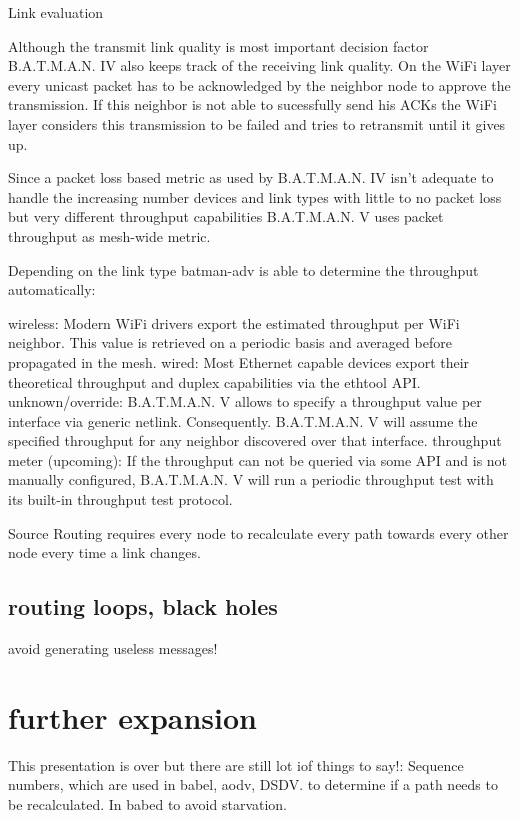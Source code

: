 \documentclass{article}
\begin{document}
\begin{frame}{Link evaluation}
 
Although the transmit link quality is most important decision factor B.A.T.M.A.N. IV also keeps track of the receiving link quality. On the WiFi layer every unicast packet has to be acknowledged by the neighbor node to approve the transmission. If this neighbor is not able to sucessfully send his ACKs the WiFi layer considers this transmission to be failed and tries to retransmit until it gives up.



Since a packet loss based metric as used by B.A.T.M.A.N. IV isn't adequate to handle the increasing number devices and link types with little to no packet loss but very different throughput capabilities B.A.T.M.A.N. V uses packet throughput as mesh-wide metric.

Depending on the link type batman-adv is able to determine the throughput automatically:

    wireless: Modern WiFi drivers export the estimated throughput per WiFi neighbor. This value is retrieved on a periodic basis and averaged before propagated in the mesh.
    wired: Most Ethernet capable devices export their theoretical throughput and duplex capabilities via the ethtool API.
    unknown/override: B.A.T.M.A.N. V allows to specify a throughput value per interface via generic netlink. Consequently. B.A.T.M.A.N. V will assume the specified throughput for any neighbor discovered over that interface.
    throughput meter (upcoming): If the throughput can not be queried via some API and is not manually configured, B.A.T.M.A.N. V will run a periodic throughput test with its built-in throughput test protocol.


\end{frame}

Source Routing requires every node to recalculate every path towards every other node every time a link changes.


\subsection{routing loops, black holes}
avoid generating useless messages!



\section{further expansion}
This presentation is over but there are still lot iof things to say!:
Sequence numbers, which are used in babel, aodv, DSDV. to determine if a path needs to be recalculated.
In babed to avoid starvation.
\end{document}
